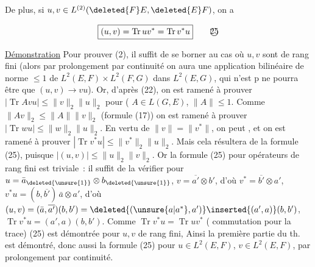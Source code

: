 De plus, si $u,v\in L^{(2)}(\deleted{F}E,\deleted{E}F)$, on a

\[
\boxed{(u,v)=\operatorname{Tr}uv^*=\operatorname{Tr}v^*u} \tag*{\textcircled{25}}
\]

\uline{Démonstration} Pour prouver (2), il suffit 
 de se borner au cas où $u,v$ sont de rang fini
(alors  par prolongement par continuité on aura
une application bilinéaire de norme $\leq1$ de $L^2(E,F)\times
L^2(F,G)$ dans $L^2(E,G)$, qui n'est p  ne pourra
être que $(u,v)\to vu$). Or,  d'après (22),
on est ramené  à prouver $|\operatorname{Tr} Avu|\leq\|v\|_2\|u\|_2$
pour ( $A\in L(G,E)$, $\|A\|\leq1$. Comme $\|Av\|_2\leq\|A\|\|v\|_2$
 (formule (17)) on est ramené à prouver
$|\operatorname{Tr}wu|\leq\|w\|_2\|u\|_2$. En vertu de $\|v\|=\|v^*\|$, on
peut  , et on est ramené
à prouver $|\operatorname{Tr}v^*u|\leq\|v^*\|_2\|u\|_2$. Mais cela résultera
de la formule (25), puisque $|(u,v)|\leq\|u\|_2\|v\|_2$.
 Or la formule (25) pour opérateurs de rang
fini est triviale \,: il suffit de la vérifier pour
$u=\bar a_{\deleted{\unsure{1}}}\otimes b_{\deleted{\unsure{1}}}$, $v=\overline{a'}\otimes b'$, d'où $v^*=\overline{b'}\otimes a'$,
$v^*u=(b,\overline{b'})\,\bar a\otimes a'$,  d'où
 $(u,v)=(\bar a,\overline{a'})(b,b')=\deleted{(\unsure{a|a^*},a')}\inserted{(a',a)}(b,b')$, $\operatorname{Tr}v^*u=(a',a)(b,b')$.
Comme $\operatorname{Tr}v^*u=\operatorname{Tr}uv^*$ ( commutation pour la trace)
(25) est démontrée pour $u,v$ de rang fini,  Ainsi
la première partie du th. est démontré, donc aussi
la formule (25) pour  $u\in L^2(E,F)$, $v\in L^2(E,F)$, par
prolongement par continuité.

